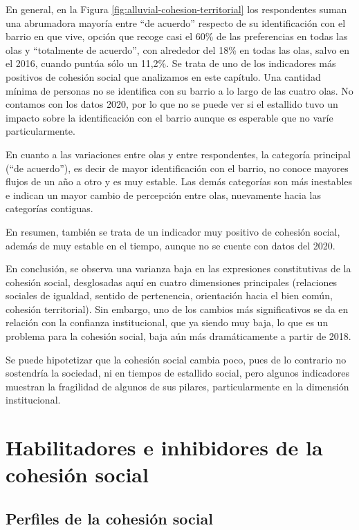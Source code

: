 \documentclass[
  12pt,
]{book}
\begin{document}
En general, en la Figura \ref{fig:alluvial-cohesion-territorial} los respondentes suman una abrumadora mayoría entre ``de acuerdo'' respecto de su identificación con el barrio en que vive, opción que recoge casi el 60\% de las preferencias en todas las olas y ``totalmente de acuerdo'', con alrededor del 18\% en todas las olas, salvo en el 2016, cuando puntúa sólo un 11,2\%. Se trata de uno de los indicadores más positivos de cohesión social que analizamos en este capítulo. Una cantidad mínima de personas no se identifica con su barrio a lo largo de las cuatro olas. No contamos con los datos 2020, por lo que no se puede ver si el estallido tuvo un impacto sobre la identificación con el barrio aunque es esperable que no varíe particularmente.

En cuanto a las variaciones entre olas y entre respondentes, la categoría principal (``de acuerdo''), es decir de mayor identificación con el barrio, no conoce mayores flujos de un año a otro y es muy estable. Las demás categorías son más inestables e indican un mayor cambio de percepción entre olas, nuevamente hacia las categorías contiguas.

En resumen, también se trata de un indicador muy positivo de cohesión social, además de muy estable en el tiempo, aunque no se cuente con datos del 2020.

En conclusión, se observa una varianza baja en las expresiones constitutivas de la cohesión social, desglosadas aquí en cuatro dimensiones principales (relaciones sociales de igualdad, sentido de pertenencia, orientación hacia el bien común, cohesión territorial). Sin embargo, uno de los cambios más significativos se da en relación con la confianza institucional, que ya siendo muy baja, lo que es un problema para la cohesión social, baja aún más dramáticamente a partir de 2018.

Se puede hipotetizar que la cohesión social cambia poco, pues de lo contrario no sostendría la sociedad, ni en tiempos de estallido social, pero algunos indicadores muestran la fragilidad de algunos de sus pilares, particularmente en la dimensión institucional.

\hypertarget{habilitadores-e-inhibidores-de-la-cohesiuxf3n-social}{%
\chapter{Habilitadores e inhibidores de la cohesión social}\label{habilitadores-e-inhibidores-de-la-cohesiuxf3n-social}}

\hypertarget{perfiles-de-la-cohesiuxf3n-social}{%
\section{Perfiles de la cohesión social}\label{perfiles-de-la-cohesiuxf3n-social}}
\end{document}
